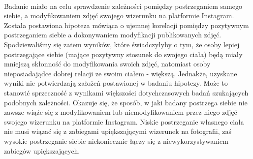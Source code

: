 \documentclass[12pt,a4paper,final,oneside,onecolumn,titlepage]{article}
\begin{document}
\paragraph{}
Badanie miało na celu sprawdzenie zależności pomiędzy postrzeganiem samego siebie, a modyfikowaniem zdjęć swojego wizerunku na platformie Instagram. Została postawiona hipoteza mówiąca o ujemnej korelacji pomiędzy pozytywnym postrzeganiem siebie a dokonywaniem modyfikacji publikowanych zdjęć. Spodziewaliśmy się zatem wyników, które świadczyłyby o tym, że osoby lepiej postrzegające siebie (mające pozytywny stosunek do swojego ciała) będą miały mniejszą skłonność do modyfikowania swoich zdjęć, natomiast osoby nieposiadajądce dobrej relacji ze swoim ciałem - większą. Jednakże, uzyskane wyniki nie potwierdzają założeń postawionej w badaniu hipotezy. Może to stanowić sprzeczność z wynikami większości dotychczasowych badań szukających podobnych zależności. Okazuje się, że sposób, w jaki badany postrzega siebie nie zawsze wiąże się z modyfikowaniem lub niemodyfikowaniem przez niego zdjęć swojego wizerunku na platformie Instagram. Niskie postrzeganie własnego ciała nie musi wiązać się z zabiegami upiększającymi wizerunek na fotografii, zaś wysokie postrzeganie siebie niekoniecznie łączy się z niewykorzystywaniem zabiegów upiększających.
\end{document}
